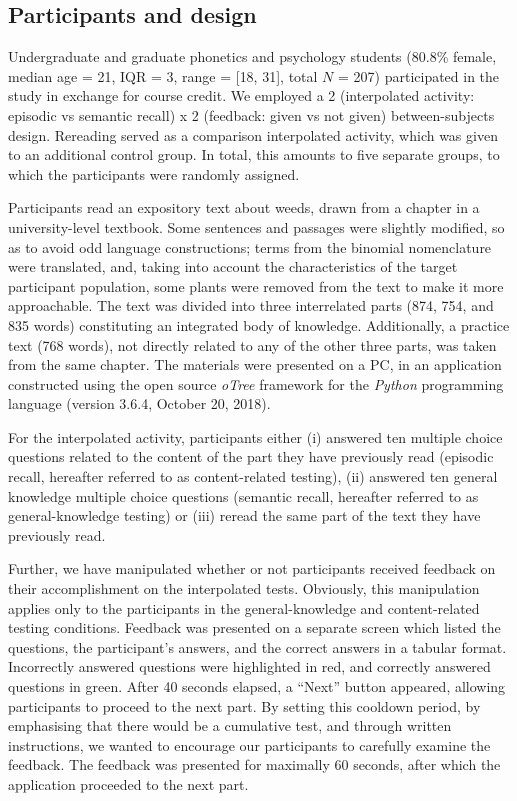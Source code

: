 \documentclass[../main.tex]{subfiles}
\begin{document}
\hypertarget{participants-and-design}{%
\subsection{Participants and design}\label{participants-and-design}}

Undergraduate and graduate phonetics and psychology students (80.8\%
female, median age = 21, IQR = 3, range = {[}18, 31{]}, total \(N\) =
207) participated in the study in exchange for course credit. We
employed a 2 (interpolated activity: episodic vs semantic recall) x 2
(feedback: given vs not given) between-subjects design. Rereading served
as a comparison interpolated activity, which was given to an additional
control group. In total, this amounts to five separate groups, to which
the participants were randomly assigned.

Participants read an expository text about weeds, drawn from a chapter
in a university-level textbook. Some sentences and passages were
slightly modified, so as to avoid odd language constructions; terms from
the binomial nomenclature were translated, and, taking into account the
characteristics of the target participant population, some plants were
removed from the text to make it more approachable. The text was divided
into three interrelated parts (874, 754, and 835 words) constituting an
integrated body of knowledge. Additionally, a practice text (768 words),
not directly related to any of the other three parts, was taken from the
same chapter. The materials were presented on a PC, in an application
constructed using the open source \textit{oTree} framework
\citep[version 2.1.35,][]{chenOTreeOpensourcePlatform2016} for the
\textit{Python} programming language (version 3.6.4, October 20, 2018).

For the interpolated activity, participants either (i) answered ten
multiple choice questions related to the content of the part they have
previously read (episodic recall, hereafter referred to as
content-related testing), (ii) answered ten general knowledge multiple
choice questions (semantic recall, hereafter referred to as
general-knowledge testing) or (iii) reread the same part of the text
they have previously read.

Further, we have manipulated whether or not participants received
feedback on their accomplishment on the interpolated tests. Obviously,
this manipulation applies only to the participants in the
general-knowledge and content-related testing conditions. Feedback was
presented on a separate screen which listed the questions, the
participant's answers, and the correct answers in a tabular format.
Incorrectly answered questions were highlighted in red, and correctly
answered questions in green. After 40 seconds elapsed, a ``Next'' button
appeared, allowing participants to proceed to the next part. By setting
this cooldown period, by emphasising that there would be a cumulative
test, and through written instructions, we wanted to encourage our
participants to carefully examine the feedback. The feedback was
presented for maximally 60 seconds, after which the application
proceeded to the next part.
\end{document}
